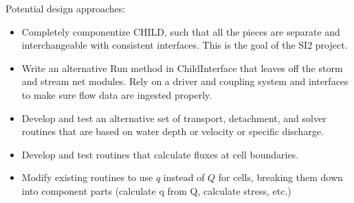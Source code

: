 \documentclass[12pt]{amsart}
\begin{document}
Potential design approaches:
\begin{itemize}
\item Completely componentize CHILD, such that all the pieces are separate and interchangeable with consistent interfaces. This is the goal of the SI2 project.
\item Write an alternative Run method in ChildInterface that leaves off the storm and stream net modules. Rely on a driver and coupling system and interfaces to make sure flow data are ingested properly.
\item Develop and test an alternative set of transport, detachment, and solver routines that are based on water depth or velocity or specific discharge.
\item Develop and test routines that calculate fluxes at cell boundaries.
\item Modify existing routines to use $q$ instead of $Q$ for cells, breaking them down into component parts (calculate q from Q, calculate stress, etc.)
\end{itemize}
\end{document}
